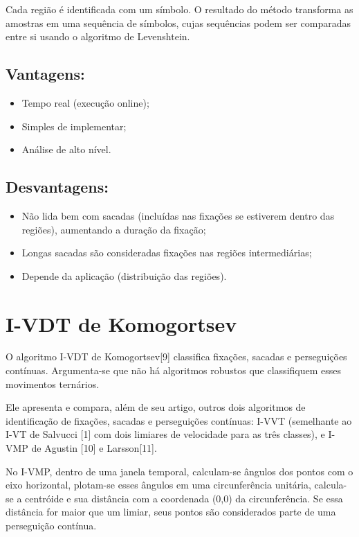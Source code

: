 \documentclass[brazil,]{report}
\begin{document}
Cada região é identificada com um símbolo. O resultado do método
transforma as amostras em uma sequência de símbolos, cujas sequências
podem ser comparadas entre si usando o algoritmo de Levenshtein.

\subsection{Vantagens:}\label{vantagens-4}

\begin{itemize}
\itemsep1pt\parskip0pt
\item
  Tempo real (execução online);
\item
  Simples de implementar;
\item
  Análise de alto nível.
\end{itemize}

\subsection{Desvantagens:}\label{desvantagens-4}

\begin{itemize}
\itemsep1pt\parskip0pt
\item
  Não lida bem com sacadas (incluídas nas fixações se estiverem dentro
  das regiões), aumentando a duração da fixação;
\item
  Longas sacadas são consideradas fixações nas regiões intermediárias;
\item
  Depende da aplicação (distribuição das regiões).
\end{itemize}

\section{I-VDT de Komogortsev}\label{i-vdt-de-komogortsev}

O algoritmo \gls{I-VDT} de Komogortsev{[}9{]} classifica fixações,
sacadas e perseguições contínuas. Argumenta-se que não há algoritmos
robustos que classifiquem esses movimentos ternários.

Ele apresenta e compara, além de seu artigo, outros dois algoritmos de
identificação de fixações, sacadas e perseguições contínuas: \gls{I-VVT}
(semelhante ao \gls{I-VT} de Salvucci {[}1{]} com dois limiares de
velocidade para as três classes), e \gls{I-VMP} de Agustin {[}10{]} e
Larsson{[}11{]}.

No I-VMP, dentro de uma janela temporal, calculam-se ângulos dos pontos
com o eixo horizontal, plotam-se esses ângulos em uma circunferência
unitária, calcula-se a centróide e sua distância com a coordenada (0,0)
da circunferência. Se essa distância for maior que um limiar, seus
pontos são considerados parte de uma perseguição contínua.
\end{document}

